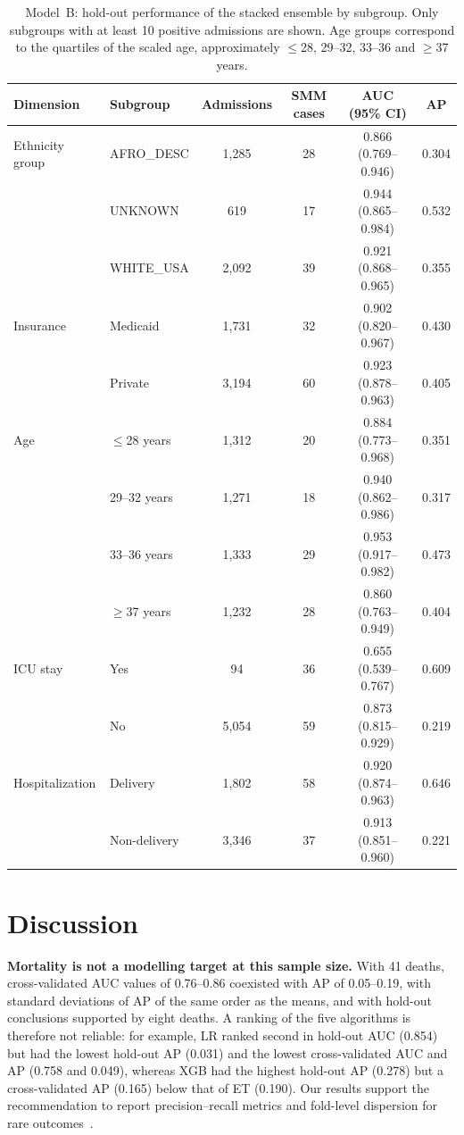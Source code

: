 \documentclass[healthcare,article,submit,pdftex,moreauthors]{Definitions/mdpi}
\begin{document}
\begin{table}[H]
\caption{Model~B: hold-out performance of the stacked ensemble by subgroup. Only subgroups with at least 10 positive admissions are shown.
Age groups correspond to the quartiles of the scaled age, approximately $\leq$28, 29--32, 33--36 and $\geq$37 years.\label{tab:subgroup}}
\small
\begin{tabularx}{\textwidth}{llccCc}
\toprule
\textbf{Dimension} & \textbf{Subgroup} & \textbf{Admissions} & \textbf{SMM cases} & \textbf{AUC (95\% CI)} & \textbf{AP}\\
\midrule
Ethnicity group & AFRO\_DESC & 1{,}285 & 28 & 0.866 (0.769--0.946) & 0.304\\
 & UNKNOWN & 619 & 17 & 0.944 (0.865--0.984) & 0.532\\
 & WHITE\_USA & 2{,}092 & 39 & 0.921 (0.868--0.965) & 0.355\\
Insurance & Medicaid & 1{,}731 & 32 & 0.902 (0.820--0.967) & 0.430\\
 & Private & 3{,}194 & 60 & 0.923 (0.878--0.963) & 0.405\\
Age & $\leq$28 years & 1{,}312 & 20 & 0.884 (0.773--0.968) & 0.351\\
 & 29--32 years & 1{,}271 & 18 & 0.940 (0.862--0.986) & 0.317\\
 & 33--36 years & 1{,}333 & 29 & 0.953 (0.917--0.982) & 0.473\\
 & $\geq$37 years & 1{,}232 & 28 & 0.860 (0.763--0.949) & 0.404\\
ICU stay & Yes & 94 & 36 & 0.655 (0.539--0.767) & 0.609\\
 & No & 5{,}054 & 59 & 0.873 (0.815--0.929) & 0.219\\
Hospitalization & Delivery & 1{,}802 & 58 & 0.920 (0.874--0.963) & 0.646\\
 & Non-delivery & 3{,}346 & 37 & 0.913 (0.851--0.960) & 0.221\\
\bottomrule
\end{tabularx}
\end{table}

\section{Discussion}\label{sec:discussion}
\textbf{Mortality is not a modelling target at this sample size.} With 41 deaths,
cross-validated AUC values of 0.76--0.86 coexisted with AP of 0.05--0.19, with
standard deviations of AP of the same order as the means, and with hold-out conclusions
supported by eight deaths. A ranking of the five algorithms is therefore not
reliable: for example, LR ranked second in hold-out AUC (0.854) but had the lowest hold-out AP (0.031) and the lowest
cross-validated AUC and AP (0.758 and 0.049), whereas XGB had the highest hold-out AP (0.278)
but a cross-validated AP (0.165) below that of ET (0.190). Our results
support the recommendation to report precision--recall metrics and
fold-level dispersion for rare outcomes~\cite{Marshall2023Imbalance,Saito2015PR}.
\end{document}
